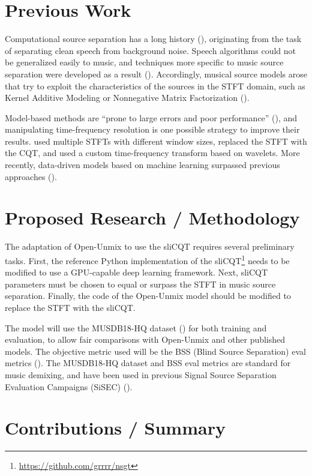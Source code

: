\documentclass[letter,12pt]{article}
\begin{document}
\section{Previous Work}

Computational source separation has a long history (\cite{musicsepgood}), originating from the task of separating clean speech from background noise. Speech algorithms could not be generalized easily to music, and techniques more specific to music source separation were developed as a result (\cite{musicseptechniques1}). Accordingly, musical source models arose that try to exploit the characteristics of the sources in the STFT domain, such as Kernel Additive Modeling or Nonnegative Matrix Factorization (\cite{musicsepgood}).

Model-based methods are ``prone to large errors and poor performance'' (\cite[13]{musicsepintro1}), and manipulating time-frequency resolution is one possible strategy to improve their results. \textcite{driedger} used multiple STFTs with different window sizes, \textcite{fitzgerald2} replaced the STFT with the CQT, and \textcite{wavelets} used a custom time-frequency transform based on wavelets. More recently, data-driven models based on machine learning surpassed previous approaches (\cite{sisec2018, musicsepintro1}).

\section{Proposed Research / Methodology}

The adaptation of Open-Unmix to use the sliCQT requires several preliminary tasks. First, the reference Python implementation of the sliCQT\footnote{\url{https://github.com/grrrr/nsgt}} needs to be modified to use a GPU-capable deep learning framework. Next, sliCQT parameters must be chosen to equal or surpass the STFT in music source separation. Finally, the code of the Open-Unmix model should be modified to replace the STFT with the sliCQT.

The model will use the MUSDB18-HQ dataset (\cite{musdb18hq}) for both training and evaluation, to allow fair comparisons with Open-Unmix and other published models. The objective metric used will be the BSS (Blind Source Separation) eval metrics (\cite{bss}). The MUSDB18-HQ dataset and BSS eval metrics are standard for music demixing, and have been used in previous Signal Source Separation Evaluation Campaigns (SiSEC) (\cite{sisec2018}).

\section{Contributions / Summary}
\end{document}
